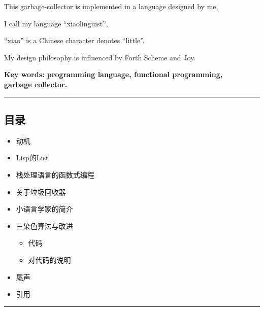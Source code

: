 \documentclass[a4paper]{article}
\begin{document}
\begin{center}
This garbage-collector is implemented in a language designed by me,
\end{center}

\begin{center}
I call my language ``xiaolinguist'',
\end{center}

\begin{center}
``xiao'' is a Chinese character denotes ``little''.
\end{center}

\begin{center}
My design philosophy is influenced by Forth Scheme and Joy.
\end{center}

\begin{center}
\textbf{Key words: programming language, functional programming, \\ garbage collector.}
\end{center}

\vspace{.5cm}\hrule\vspace{.5cm}


\newpage


\subsection{目录}

\begin{itemize}
\item 动机
\item Lisp的List
\item 栈处理语言的函数式编程
\item 关于垃圾回收器
\item 小语言学家的简介
\item 三染色算法与改进

\begin{itemize}
\item 代码
\item 对代码的说明
\end{itemize}
\item 尾声
\item 引用
\end{itemize}

\vspace{.5cm}\hrule\vspace{.5cm}



\newpage
\end{document}
